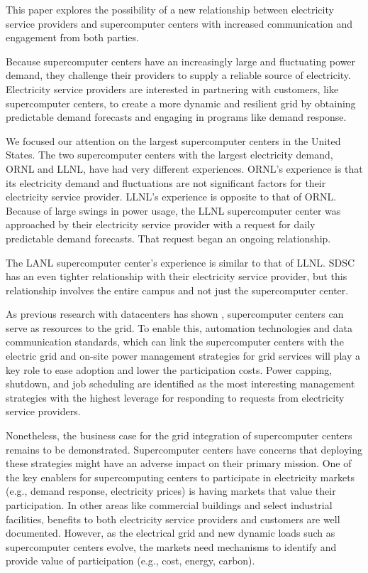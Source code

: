 This paper explores the possibility of a new relationship between electricity service providers
and supercomputer centers with increased communication and engagement from both parties.

Because supercomputer centers have an increasingly large and fluctuating
power demand, they challenge their providers to supply a reliable
source of electricity.
Electricity service providers are interested in partnering with customers,
like supercomputer centers, to create a more dynamic and resilient grid
by obtaining predictable demand forecasts and engaging in programs like 
demand response.

We focused our attention on the largest supercomputer centers in the United States. The two supercomputer 
centers with the largest electricity demand, ORNL and LLNL, have had very different experiences.  
ORNL's experience is that its electricity demand and fluctuations are not significant factors for their 
electricity service provider.  
LLNL's experience is opposite to that of ORNL.  Because of large swings in 
power usage, the LLNL supercomputer center was approached by their electricity service provider with a 
request for daily predictable demand forecasts. That request began an ongoing relationship.  

The LANL supercomputer center's experience is similar to that of LLNL. SDSC has an even tighter relationship 
with their electricity service provider, but this relationship involves the entire campus and not just the 
supercomputer center.  

As previous research with datacenters has shown \cite{LBNL-6560E}, supercomputer centers can serve as   
resources to the grid. To enable this, automation technologies and data communication standards, 
which can link the supercomputer centers with the electric grid and on-site power management strategies 
for grid services will play a key role to ease adoption and lower the participation costs.  Power capping, 
shutdown, and job scheduling are identified as the most interesting management strategies with the highest 
leverage for responding to requests from electricity service providers.  

Nonetheless, the business case for the grid integration of supercomputer centers remains to be demonstrated.  
Supercomputer centers have concerns that deploying these strategies might have an adverse impact on 
their primary mission. One of the key enablers for supercomputing centers to participate in 
electricity markets (e.g., demand response, electricity prices) is having markets that value their 
participation. In other areas like commercial buildings and select industrial facilities, benefits to 
both electricity service providers and customers are well documented. However, as the electrical grid 
and new dynamic loads such as supercomputer centers evolve, the markets need mechanisms to identify 
and provide value of participation (e.g., cost, energy, carbon).

